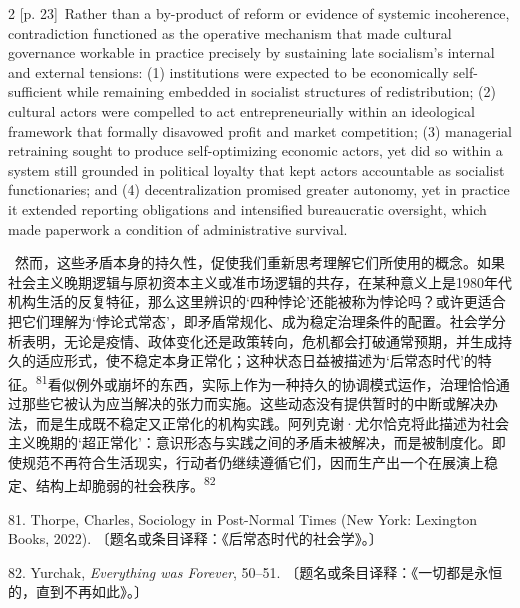 \documentclass[10pt,a4paper]{article}
\begin{document}
\begin{paracol}{2}
\switchcolumn
{\scriptsize\color{gray} [p. 23]}\ Rather than a by-product of reform or evidence of systemic incoherence, contradiction functioned as the operative mechanism that made cultural governance workable in practice precisely by sustaining late socialism’s internal and external tensions: (1) institutions were expected to be economically self-sufficient while remaining embedded in socialist structures of redistribution; (2) cultural actors were compelled to act entrepreneurially within an ideological framework that formally disavowed profit and market competition; (3) managerial retraining sought to produce self-optimizing economic actors, yet did so within a system still grounded in political loyalty that kept actors accountable as socialist functionaries; and (4) decentralization promised greater autonomy, yet in practice it extended reporting obligations and intensified bureaucratic oversight, which made paperwork a condition of administrative survival.\par
\switchcolumn*
{\scriptsize\color{gray} [p. 23]}\ 然而，这些矛盾本身的持久性，促使我们重新思考理解它们所使用的概念。如果社会主义晚期逻辑与原初资本主义或准市场逻辑的共存，在某种意义上是1980年代机构生活的反复特征，那么这里辨识的‘四种悖论’还能被称为悖论吗？或许更适合把它们理解为‘悖论式常态’，即矛盾常规化、成为稳定治理条件的配置。社会学分析表明，无论是疫情、政体变化还是政策转向，危机都会打破通常预期，并生成持久的适应形式，使不稳定本身正常化；这种状态日益被描述为‘后常态时代’的特\mbox{征。\textsuperscript{81}}看似例外或崩坏的东西，实际上作为一种持久的协调模式运作，治理恰恰通过那些它被认为应当解决的张力而实施。这些动态没有提供暂时的中断或解决办法，而是生成既不稳定又正常化的机构实践。阿列克谢·尤尔恰克将此描述为社会主义晚期的‘超正常化’：意识形态与实践之间的矛盾未被解决，而是被制度化。即使规范不再符合生活现实，行动者仍继续遵循它们，因而生产出一个在展演上稳定、结构上却脆弱的社会秩\mbox{序。\textsuperscript{82}}\par{\small 81. Thorpe, Charles, Sociology in Post-Normal Times (New York: Lexington Books, 2022). 〔题名或条目译释：《后常态时代的社会学》。〕\par}{\small 82. Yurchak, \textit{Everything was Forever}, 50–51. 〔题名或条目译释：《一切都是永恒的，直到不再如此》。〕\par}
\switchcolumn

\end{paracol}
\end{document}
